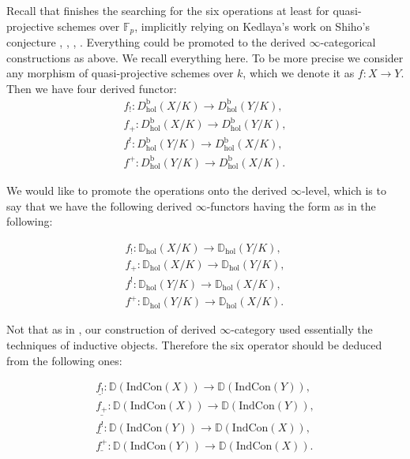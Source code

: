 \documentclass[11pt]{book}
\theoremstyle{definition}
\numberwithin{equation}{section}
\begin{document}
\indent Recall that \cite{Abe1} finishes the searching for the six operations at least for quasi-projective schemes over $\mathbb{F}_p$, implicitly relying on Kedlaya's work on Shiho's conjecture \cite{Ked4}, \cite{Ked5}, \cite{Ked6}, \cite{Ked7}. Everything could be promoted to the derived $\infty$-categorical constructions as above. We recall everything here. To be more precise we consider any morphism of quasi-projective schemes over $k$, which we denote it as $f:X\rightarrow Y$. Then we have four derived functor:
\begin{align}
f_!: D^\mathrm{b}_\mathrm{hol}(X/K)\rightarrow D^\mathrm{b}_\mathrm{hol}(Y/K),\\
f_+: D^\mathrm{b}_\mathrm{hol}(X/K)\rightarrow D^\mathrm{b}_\mathrm{hol}(Y/K),\\
f^!: D^\mathrm{b}_\mathrm{hol}(Y/K)\rightarrow D^\mathrm{b}_\mathrm{hol}(X/K),\\
f^+: D^\mathrm{b}_\mathrm{hol}(Y/K)\rightarrow D^\mathrm{b}_\mathrm{hol}(X/K).
\end{align}


\indent We would like to promote the operations onto the derived $\infty$-level, which is to say that we have the following derived $\infty$-functors having the form as in the following:

\begin{align}
f_!: \mathbb{D}_\mathrm{hol}(X/K)\rightarrow \mathbb{D}_\mathrm{hol}(Y/K),\\
f_+: \mathbb{D}_\mathrm{hol}(X/K)\rightarrow \mathbb{D}_\mathrm{hol}(Y/K),\\
f^!: \mathbb{D}_\mathrm{hol}(Y/K)\rightarrow \mathbb{D}_\mathrm{hol}(X/K),\\
f^+: \mathbb{D}_\mathrm{hol}(Y/K)\rightarrow \mathbb{D}_\mathrm{hol}(X/K).
\end{align}

\indent Not that as in \cite{Abe1}, our construction of derived $\infty$-category used essentially the techniques of inductive objects. Therefore the six operator should be deduced from the following ones:

\begin{align}
\underline{f_!}: \mathbb{D}(\mathrm{Ind}\mathrm{Con}(X))\rightarrow \mathbb{D}(\mathrm{Ind}\mathrm{Con}(Y)),\\
\underline{f_+}: \mathbb{D}(\mathrm{Ind}\mathrm{Con}(X))\rightarrow \mathbb{D}(\mathrm{Ind}\mathrm{Con}(Y)),\\
\underline{f^!}: \mathbb{D}(\mathrm{Ind}\mathrm{Con}(Y))\rightarrow \mathbb{D}(\mathrm{Ind}\mathrm{Con}(X)),\\
\underline{f^+}: \mathbb{D}(\mathrm{Ind}\mathrm{Con}(Y))\rightarrow \mathbb{D}(\mathrm{Ind}\mathrm{Con}(X)).
\end{align}
 
\end{document}
